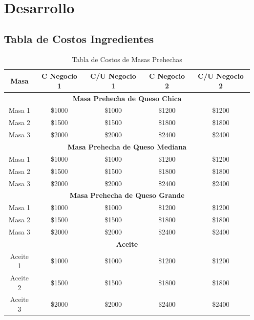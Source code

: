 \documentclass[12pt]{article}
\begin{document}
\section{Desarrollo} %

\subsection{Tabla de Costos Ingredientes}

\begin{table}[h!]
    \centering
    \begin{tabular}{|| c | c | c | c | c||} %
        \hline
        \textbf{Masa} & \textbf{C Negocio 1} & \textbf{C/U Negocio 1} & \textbf{C Negocio 2} & \textbf{C/U Negocio 2} \\ [0.5ex]
        \hline\hline

        \multicolumn{5}{||c||}{\textbf{Masa Prehecha de Queso Chica}} \\ [0.5ex] \hline \hline
        Masa 1 & \$1000 & \$1000 & \$1200 & \$1200 \\ \hline
        Masa 2 & \$1500 & \$1500 & \$1800 & \$1800 \\ \hline
        Masa 3 & \$2000 & \$2000 & \$2400 & \$2400 \\ [1ex] \hline \hline

        \multicolumn{5}{||c||}{\textbf{Masa Prehecha de Queso Mediana}} \\ [0.5ex] \hline \hline
        Masa 1 & \$1000 & \$1000 & \$1200 & \$1200 \\ \hline
        Masa 2 & \$1500 & \$1500 & \$1800 & \$1800 \\ \hline
        Masa 3 & \$2000 & \$2000 & \$2400 & \$2400 \\ [1ex] \hline \hline

        \multicolumn{5}{||c||}{\textbf{Masa Prehecha de Queso Grande}} \\ [0.5ex] \hline \hline
        Masa 1 & \$1000 & \$1000 & \$1200 & \$1200 \\ \hline
        Masa 2 & \$1500 & \$1500 & \$1800 & \$1800 \\ \hline
        Masa 3 & \$2000 & \$2000 & \$2400 & \$2400 \\ [1ex] \hline \hline

        \multicolumn{5}{||c||}{\textbf{Aceite}} \\ [0.5ex] \hline \hline
        Aceite 1 & \$1000 & \$1000 & \$1200 & \$1200 \\ \hline
        Aceite 2 & \$1500 & \$1500 & \$1800 & \$1800 \\ \hline
        Aceite 3 & \$2000 & \$2000 & \$2400 & \$2400 \\ [1ex] \hline \hline



    \end{tabular}
    \caption{Tabla de Costos de Masas Prehechas}
    \label{tab:costos_masas}
\end{table}
\end{document}
